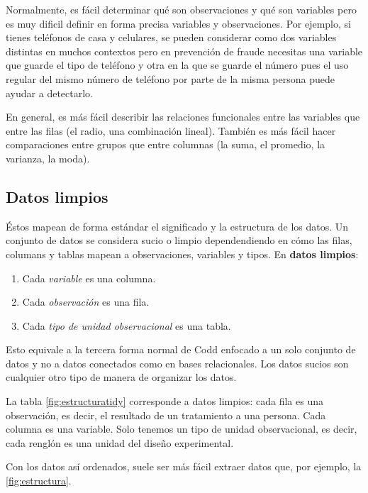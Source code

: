 \documentclass[]{article}
\begin{document}
Normalmente, es fácil determinar qué son observaciones y qué son
variables pero es muy dificil definir en forma precisa variables y
observaciones. Por ejemplo, si tienes teléfonos de casa y celulares, se
pueden considerar como dos variables distintas en muchos contextos pero
en prevención de fraude necesitas una variable que guarde el tipo de
teléfono y otra en la que se guarde el número pues el uso regular del
mismo número de teléfono por parte de la misma persona puede ayudar a
detectarlo.

En general, es más fácil describir las relaciones funcionales entre las
variables que entre las filas (el radio, una combinación lineal).
También es más fácil hacer comparaciones entre grupos que entre columnas
(la suma, el promedio, la varianza, la moda).

\subsection{Datos limpios}\label{datos-limpios-1}

Éstos mapean de forma estándar el significado y la estructura de los
datos. Un conjunto de datos se considera sucio o limpio dependendiendo
en cómo las filas, columans y tablas mapean a observaciones, variables y
tipos. En \textbf{datos limpios}:

\begin{enumerate}
\def\labelenumi{\arabic{enumi}.}
\itemsep1pt\parskip0pt
\item
  Cada \emph{variable} es una columna.
\item
  Cada \emph{observación} es una fila.
\item
  Cada \emph{tipo de unidad observacional} es una tabla.
\end{enumerate}

Esto equivale a la tercera forma normal de Codd enfocado a un solo
conjunto de datos y no a datos conectados como en bases relacionales.
Los datos sucios son cualquier otro tipo de manera de organizar los
datos.

La tabla \ref{fig:estructuratidy} corresponde a datos limpios: cada fila
es una observación, es decir, el resultado de un tratamiento a una
persona. Cada columna es una variable. Solo tenemos un tipo de unidad
observacional, es decir, cada renglón es una unidad del diseño
experimental.

Con los datos así ordenados, suele ser más fácil extraer datos que, por
ejemplo, la \ref{fig:estructura}.

\renewcommand\bcStyleTitre[1]{\large\textcolor{bbblack}{#1}}
\end{document}
